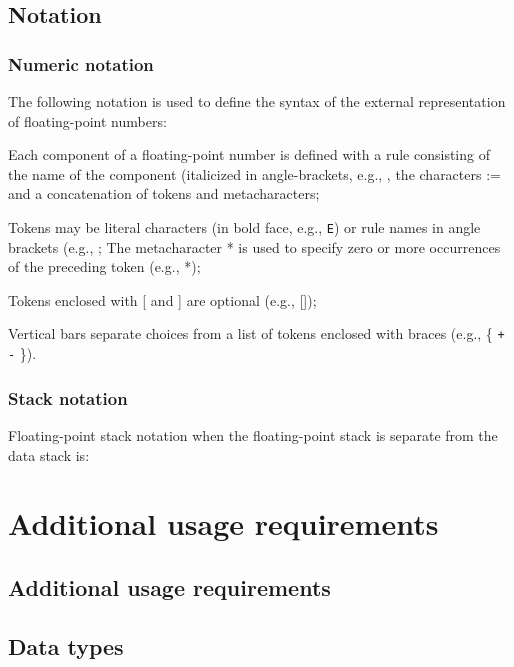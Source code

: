 \subsection{Notation} %

\subsubsection{Numeric notation} %

The following notation is used to define the syntax of the external
representation of floating-point numbers:

Each component of a floating-point number is defined with a rule
consisting of the name of the component (italicized in angle-brackets,
e.g., , the characters \textsf{:=} and a concatenation of
tokens and metacharacters;

Tokens may be literal characters (in bold face, e.g., \texttt{E}) or
rule names in angle brackets (e.g., ; The metacharacter *
is used to specify zero or more occurrences of the preceding token
(e.g., *);

Tokens enclosed with [ and ] are optional (e.g., []);

Vertical bars separate choices from a list of tokens enclosed with
braces (e.g., \{ \texttt{+} {\textbar} \texttt{-} \}).


\subsubsection{Stack notation} %

Floating-point stack notation when the floating-point stack is
separate from the data stack is:
\begin{quote}
\end{quote}

\section{Additional usage requirements} %

\begin{info}
\subsection{Additional usage requirements} %
\end{info}

\subsection{Data types} %
\label{float:datatypes}

